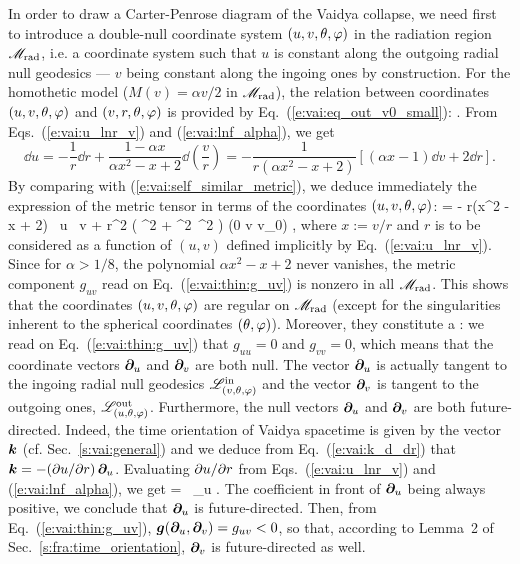 In order to draw a Carter-Penrose diagram of the Vaidya collapse,
we need first to introduce a double-null coordinate system $(u, v, \theta,\varphi)$
in the radiation region $\mathscr{M}_{\rm rad}$, i.e. a coordinate system such that
$u$ is constant along the outgoing radial null geodesics ---
$v$ being constant along the ingoing ones by construction.
For the homothetic model ($M(v) = \alpha v /2$ in $\mathscr{M}_{\rm rad}$),
the relation between coordinates $(u, v, \theta,\varphi)$ and
$(v, r, \theta, \varphi)$ is provided by Eq.~(\ref{e:vai:eq_out_v0_small}):
\be \label{e:vai:u_lnr_v}
    .
\ee
From Eqs.~(\ref{e:vai:u_lnr_v}) and (\ref{e:vai:lnf_alpha}), we get
\[
   \dd u = - \frac{1}{r} \dd r  +  \frac{1 - \alpha x}{\alpha x^2 - x + 2} \dd\left(\frac{v}{r}\right)
    = - \frac{1}{r(\alpha x^2 - x + 2)} \left[ (\alpha x - 1) \dd v + 2 \dd r \right] .
\]
By comparing with (\ref{e:vai:self_similar_metric}), we deduce immediately
the expression of the metric tensor in terms of the coordinates $(u,v,\theta,\varphi)$:
\be \label{e:vai:thin:g_uv}
     =  - r(\alpha x^2 - x + 2) \, \dd u \, \dd v
    + r^2 \left( \dd\th^2 + \sin^2\th\, \dd\ph^2 \right) \qquad
        (0 \leq v \leq v_0) ,
\ee
where $x := v/r$  and $r$ is to be considered as a function of $(u,v)$ defined implicitly
by Eq.~(\ref{e:vai:u_lnr_v}).
Since for $\alpha > 1/8$, the polynomial $\alpha x^2 - x + 2$ never vanishes,
the metric component $g_{uv}$ read on Eq.~(\ref{e:vai:thin:g_uv}) is
nonzero in all $\mathscr{M}_{\rm rad}$. This shows that
the coordinates $(u,v,\theta,\varphi)$ are regular on $\mathscr{M}_{\rm rad}$
(except for the singularities inherent to the spherical coordinates $(\theta,\varphi)$).
Moreover, they constitute a :
we read on Eq.~(\ref{e:vai:thin:g_uv}) that
$g_{uu} = 0$ and $g_{vv} = 0$, which means that the coordinate vectors $\bm{\partial}_u$
and $\bm{\partial}_v$ are both null. The vector $\bm{\partial}_u$ is actually tangent to the
ingoing radial null geodesics $\mathscr{L}^{\rm in}_{(v,\theta,\varphi)}$
and the vector $\bm{\partial}_v$ is tangent to the outgoing ones, $\mathscr{L}^{\rm out}_{(u,\theta,\varphi)}$.
Furthermore, the null vectors $\bm{\partial}_u$
and $\bm{\partial}_v$ are both future-directed. Indeed,
the time orientation of Vaidya spacetime is given by the vector $\bm{k}$
(cf. Sec.~\ref{s:vai:general}) and we deduce from Eq.~(\ref{e:vai:k_d_dr})
that $\bm{k} = - ({\partial u}/{\partial r}) \, \bm{\partial}_u$. Evaluating ${\partial u}/{\partial r}$
from Eqs.~(\ref{e:vai:u_lnr_v}) and (\ref{e:vai:lnf_alpha}), we get
\be
     = \, \wpar_u .
\ee
The coefficient in front of $\bm{\partial}_u$ being always positive, we conclude that
$\bm{\partial}_u$ is future-directed. Then, from Eq.~(\ref{e:vai:thin:g_uv}),
$\bm{g}(\bm{\partial}_u,\bm{\partial}_v) = g_{uv} < 0$, so that, according to Lemma~2 of
Sec.~\ref{s:fra:time_orientation}, $\bm{\partial}_v$ is future-directed as well.

